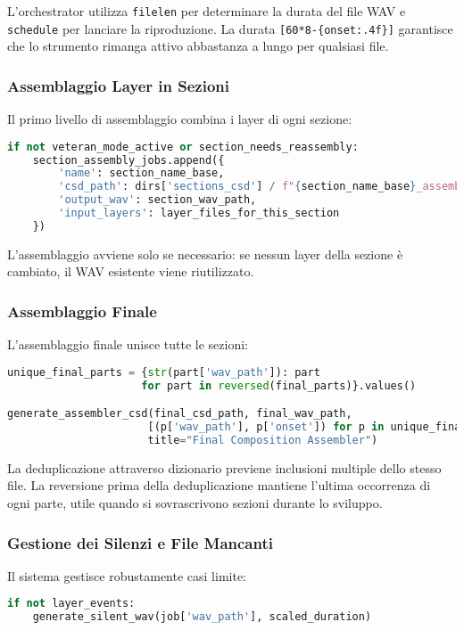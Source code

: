 L'orchestrator utilizza \texttt{filelen} per determinare la durata del file WAV e \texttt{schedule} per lanciare la riproduzione. La durata \texttt{[60*8{-}\{onset:.4f\}]} garantisce che lo strumento rimanga attivo abbastanza a lungo per qualsiasi file.
\subsubsection{Assemblaggio Layer in Sezioni}
Il primo livello di assemblaggio combina i layer di ogni sezione:

\begin{lstlisting}[language=Python]
if not veteran_mode_active or section_needs_reassembly:
    section_assembly_jobs.append({
        'name': section_name_base,
        'csd_path': dirs['sections_csd'] / f"{section_name_base}_assembler.csd",
        'output_wav': section_wav_path,
        'input_layers': layer_files_for_this_section
    })
\end{lstlisting}

L'assemblaggio avviene solo se necessario: se nessun layer della sezione è cambiato, il WAV esistente viene riutilizzato.
\subsubsection{Assemblaggio Finale}
L'assemblaggio finale unisce tutte le sezioni:

\begin{lstlisting}[language=Python]
unique_final_parts = {str(part['wav_path']): part 
                     for part in reversed(final_parts)}.values()

generate_assembler_csd(final_csd_path, final_wav_path, 
                      [(p['wav_path'], p['onset']) for p in unique_final_parts],
                      title="Final Composition Assembler")
\end{lstlisting}

La deduplicazione attraverso dizionario previene inclusioni multiple dello stesso file. La reversione prima della deduplicazione mantiene l'ultima occorrenza di ogni parte, utile quando si sovrascrivono sezioni durante lo sviluppo.
\subsubsection{Gestione dei Silenzi e File Mancanti}
Il sistema gestisce robustamente casi limite:

\begin{lstlisting}[language=Python]
if not layer_events:
    generate_silent_wav(job['wav_path'], scaled_duration)
\end{lstlisting}

